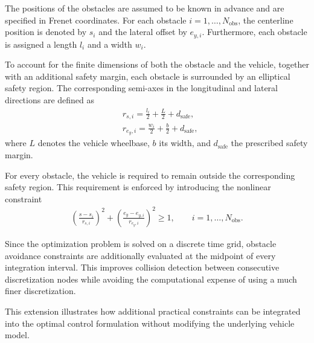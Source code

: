 The positions of the obstacles are assumed to be known in advance and are specified in Frenet coordinates. For each obstacle $i=1,\ldots,N_{\mathrm{obs}}$, the centerline position is denoted by $s_i$ and the lateral offset by $e_{y,i}$. Furthermore, each obstacle is assigned a length $l_i$ and a width $w_i$.

To account for the finite dimensions of both the obstacle and the vehicle, together with an additional safety margin, each obstacle is surrounded by an elliptical safety region. The corresponding semi-axes in the longitudinal and lateral directions are defined as
\begin{align*}
    & r_{s,i}=\frac{l_i}{2}+\frac{L}{2}+d_{\mathrm{safe}},
    \\
    & r_{e_y,i}=\frac{w_i}{2}+\frac{b}{2}+d_{\mathrm{safe}},
\end{align*}
where $L$ denotes the vehicle wheelbase, $b$ its width, and $d_{\mathrm{safe}}$ the prescribed safety margin.

For every obstacle, the vehicle is required to remain outside the corresponding safety region. This requirement is enforced by introducing the nonlinear constraint
\begin{align}
\left(\frac{s-s_i}{r_{s,i}}\right)^2
+
\left(\frac{e_y-e_{y,i}}{r_{e_y,i}}\right)^2
\ge 1,
\qquad i=1,\ldots,N_{\mathrm{obs}}.
\end{align}

Since the optimization problem is solved on a discrete time grid, obstacle avoidance constraints are additionally evaluated at the midpoint of every integration interval. This improves collision detection between consecutive discretization nodes while avoiding the computational expense of using a much finer discretization.

This extension illustrates how additional practical constraints can be integrated into the optimal control formulation without modifying the underlying vehicle model.